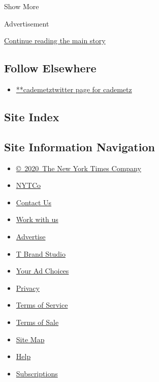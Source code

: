Show More

Advertisement

\protect\hyperlink{after-mid2}{Continue reading the main story}

\hypertarget{follow-elsewhere}{%
\subsection{Follow Elsewhere}\label{follow-elsewhere}}

\begin{itemize}
\tightlist
\item
  \href{https://twitter.com/cademetz}{**cademetztwitter page for
  cademetz}
\end{itemize}

\hypertarget{site-index}{%
\subsection{Site Index}\label{site-index}}

\hypertarget{site-information-navigation}{%
\subsection{Site Information
Navigation}\label{site-information-navigation}}

\begin{itemize}
\tightlist
\item
  \href{https://help.nytimes3xbfgragh.onion/hc/en-us/articles/115014792127-Copyright-notice}{©~2020~The
  New York Times Company}
\end{itemize}

\begin{itemize}
\tightlist
\item
  \href{https://www.nytco.com/}{NYTCo}
\item
  \href{https://help.nytimes3xbfgragh.onion/hc/en-us/articles/115015385887-Contact-Us}{Contact
  Us}
\item
  \href{https://www.nytco.com/careers/}{Work with us}
\item
  \href{https://nytmediakit.com/}{Advertise}
\item
  \href{http://www.tbrandstudio.com/}{T Brand Studio}
\item
  \href{https://www.nytimes3xbfgragh.onion/privacy/cookie-policy\#how-do-i-manage-trackers}{Your
  Ad Choices}
\item
  \href{https://www.nytimes3xbfgragh.onion/privacy}{Privacy}
\item
  \href{https://help.nytimes3xbfgragh.onion/hc/en-us/articles/115014893428-Terms-of-service}{Terms
  of Service}
\item
  \href{https://help.nytimes3xbfgragh.onion/hc/en-us/articles/115014893968-Terms-of-sale}{Terms
  of Sale}
\item
  \href{https://spiderbites.nytimes3xbfgragh.onion}{Site Map}
\item
  \href{https://help.nytimes3xbfgragh.onion/hc/en-us}{Help}
\item
  \href{https://www.nytimes3xbfgragh.onion/subscription?campaignId=37WXW}{Subscriptions}
\end{itemize}
